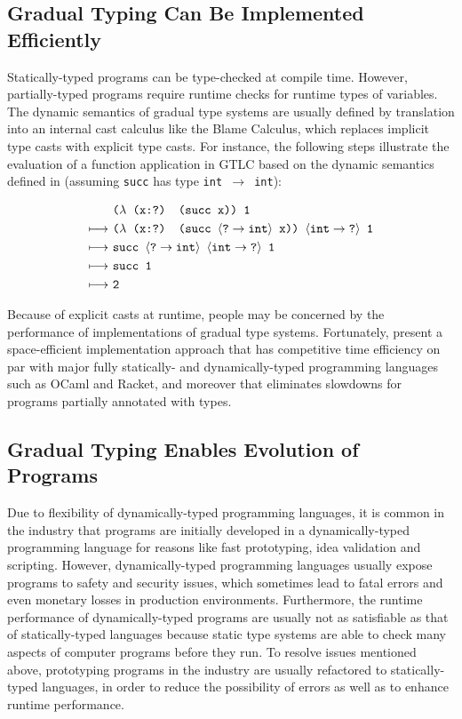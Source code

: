 \subsection{Gradual Typing Can Be Implemented Efficiently}
Statically-typed programs can be type-checked at compile time. However, partially-typed programs require runtime checks for runtime types of variables. The dynamic semantics of gradual type systems are usually defined by translation into an internal cast calculus like the Blame Calculus, which replaces implicit type casts with explicit type casts. For instance, the following steps illustrate the evaluation of a function application in GTLC based on the dynamic semantics defined in \cite{siek2006gradual} (assuming {\tt succ} has type {\tt int $\rightarrow$ int}):

\begin{align*}
& \text{\tt ($\lambda$ (x:?) (succ x)) 1} \\
    \longmapsto \ & \text{\tt ($\lambda$ (x:?) (succ $\langle \text{\tt ?} \rightarrow \text{\tt int} \rangle$ x)) $\langle \text{\tt int} \rightarrow \text{\tt ?} \rangle$ 1} \\
    \longmapsto \ & \text{\tt succ $\langle \text{\tt ?} \rightarrow \text{\tt int} \rangle$ $\langle \text{\tt int} \rightarrow \text{\tt ?} \rangle$ 1} \\
    \longmapsto \ & \text{\tt succ 1} \\
    \longmapsto \ & \text{\tt 2}
\end{align*}

Because of explicit casts at runtime, people may be concerned by the performance of implementations of gradual type systems. Fortunately, \citet{kuhlenschmidt2018efficient} present a space-efficient implementation approach that has competitive time efficiency on par with major fully statically- and dynamically-typed programming languages such as OCaml and Racket, and moreover that eliminates slowdowns for programs partially annotated with types.

\subsection{Gradual Typing Enables Evolution of Programs}
Due to flexibility of dynamically-typed programming languages, it is common in the industry that programs are initially developed in a dynamically-typed programming language for reasons like fast prototyping, idea validation and scripting. However, dynamically-typed programming languages usually expose programs to safety and security issues, which sometimes lead to fatal errors and even monetary losses in production environments. Furthermore, the runtime performance of dynamically-typed programs are usually not as satisfiable as that of statically-typed languages because static type systems are able to check many aspects of computer programs before they run. To resolve issues mentioned above, prototyping programs in the industry are usually refactored to statically-typed languages, in order to reduce the possibility of errors as well as to enhance runtime performance.

